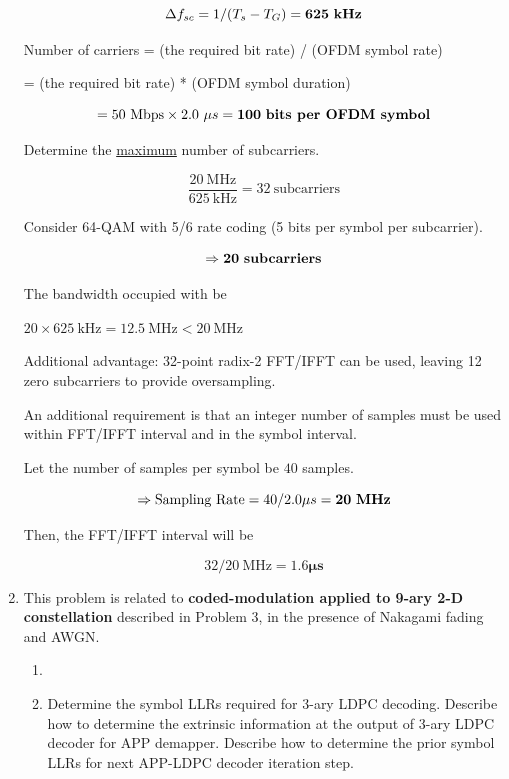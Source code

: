 \documentclass[fleqn]{article}
\begin{document}
\begin{enumerate}
		\begin{equation*}
			{\Delta}f_{sc} = 1/(T_s - T_G) = \mathbf{625\ \text{\textbf{kHz}}}
		\end{equation*}
		
		Number of carriers = (the required bit rate) / (OFDM symbol rate)
		
		= (the required bit rate) * (OFDM symbol duration)
		 
		\begin{equation*}
			= 50\ \text{Mbps} \times 2.0\ {\mu}s = \mathbf{100\ \text{\textbf{bits per OFDM symbol}}}
		\end{equation*}
		
		Determine the \underline{maximum} number of subcarriers.
		
		\begin{equation*}
			\frac{20\ \text{MHz}}{625\ \text{kHz}} = 32\ \text{subcarriers}
		\end{equation*}
		
		Consider 64-QAM with 5/6 rate coding (5 bits per symbol per subcarrier).
		
		\begin{equation*}
			\Rightarrow \mathbf{20}\ \text{\textbf{subcarriers}}
		\end{equation*}
		
		The bandwidth occupied with be
		
		$20 \times 625\ \text{kHz} = 12.5\ \text{MHz} < 20\ \text{MHz}$
		
		Additional advantage: 32-point radix-2 FFT/IFFT can be used, leaving 12 zero subcarriers to provide oversampling.
		
		An additional requirement is that an integer number of samples must be used within FFT/IFFT interval and in the symbol interval.
		
		Let the number of samples per symbol be $40$ samples.
		
		\begin{equation*}
			\Rightarrow \text{Sampling Rate} = 40/2.0{\mu}s = \mathbf{20}\ \text{\textbf{MHz}}
		\end{equation*}
		
		Then, the FFT/IFFT interval will be
		
		\begin{equation*}
			32/20\ \text{MHz} = \mathbf{1.6 {\mu}s}
		\end{equation*}		
		
		\item This problem is related to \textbf{coded-modulation applied to 9-ary 2-D constellation} described in Problem 3, in the presence of Nakagami fading and AWGN.
		
		\begin{enumerate}
			\item 
			
			
			
			\item Determine the symbol LLRs required for 3-ary LDPC decoding. Describe how to determine the extrinsic information at the output of 3-ary LDPC decoder for APP demapper. Describe how to determine the prior symbol LLRs for next APP-LDPC decoder iteration step.
		\end{enumerate}
	\end{enumerate}
\end{document}
